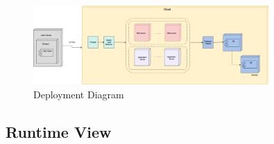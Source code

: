 \begin{figure}[H]
\centering
\includegraphics[width=0.8\textwidth]{Images/deployment-view1.png}
\caption{\label{fig:metamodel4}Deployment Diagram}
\end{figure}

\subsection{Runtime View}

